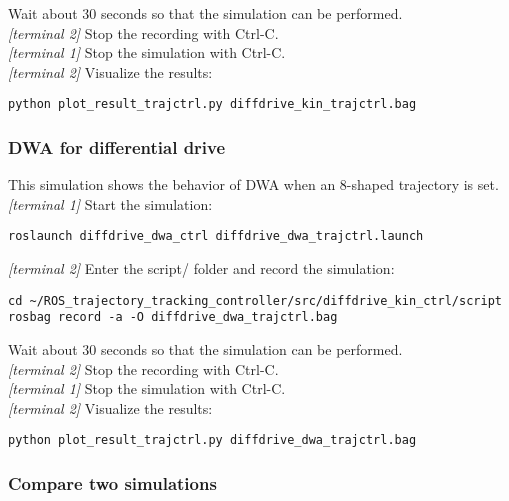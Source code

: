 \documentclass[11pt,a4paper]{article}
\begin{document}
Wait about 30 seconds so that the simulation can be performed.\\

\textit{[terminal 2]} Stop the recording with Ctrl-C.\\

\textit{[terminal 1]} Stop the simulation with Ctrl-C.\\

\textit{[terminal 2]} Visualize the results:
\begin{lstlisting}
python plot_result_trajctrl.py diffdrive_kin_trajctrl.bag
\end{lstlisting}

\subsubsection{DWA for differential drive}

This simulation shows the behavior of DWA when an 8-shaped trajectory is set.\\

\textit{[terminal 1]} Start the simulation:
\begin{lstlisting}
roslaunch diffdrive_dwa_ctrl diffdrive_dwa_trajctrl.launch
\end{lstlisting}

\textit{[terminal 2]} Enter the script/ folder and record the simulation:
\begin{lstlisting}
cd ~/ROS_trajectory_tracking_controller/src/diffdrive_kin_ctrl/script
rosbag record -a -O diffdrive_dwa_trajctrl.bag
\end{lstlisting}

Wait about 30 seconds so that the simulation can be performed.\\

\textit{[terminal 2]} Stop the recording with Ctrl-C.\\

\textit{[terminal 1]} Stop the simulation with Ctrl-C.\\

\textit{[terminal 2]} Visualize the results:
\begin{lstlisting}
python plot_result_trajctrl.py diffdrive_dwa_trajctrl.bag
\end{lstlisting}


\subsubsection{Compare two simulations}
\end{document}
